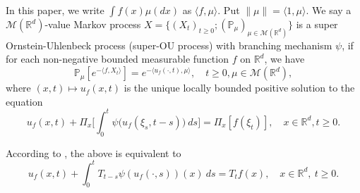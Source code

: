 \documentclass[12pt, a4paper]{amsart}
\theoremstyle{definition}
\numberwithin{equation}{section}
\begin{document}
In this paper, we write $\int f(x)\mu(dx)$ as $\langle f,\mu\rangle$. Put $\|\mu\|=\langle 1,\mu\rangle$.
We say a $\mathcal{M}(\mathbb{R}^d)$-value Markov process $X = \{(X_t)_{t\geq 0}; (\mathbb{P}_{\mu})_{\mu \in \mathcal M(\mathbb R^d)}\}$ is a super Ornstein-Uhlenbeck process (super-OU process) with branching mechanism $\psi$, if for each non-negative bounded measurable function $f$ on $\mathbb{R}^d$, we have
\begin{equation} \label{super}
    \mathbb{P}_{\mu}[e^{-\langle f,X_t \rangle}]
    = e^{-\langle u_f(\cdot , t), \mu \rangle}, 
    \quad t\geq 0, \mu \in \mathcal M(\mathbb R^d),
\end{equation}
where $(x,t) \mapsto u_f(x, t)$ is the unique locally bounded positive solution to the equation
\begin{equation}\label{eq1}
     u_f(x , t) + \Pi_x \Big[ \int_0^t\psi\big(u_f(\xi_s,t-s)\big)~ds\Big] 
     = \Pi_x [f(\xi_t)],
     \quad x\in \mathbb R^d, t\geq 0.
\end{equation}

According to \cite[section 2]{Li2011Measure}, the above is equivalent to
\begin{equation}\label{eq2}
     u_f(x , t) + \int_0^t T_{t-s}\psi(u_f(\cdot,s))(x)~ds=T_tf(x),\quad x \in \mathbb{R}^d,~ t\geq 0.
\end{equation}
\end{document}
